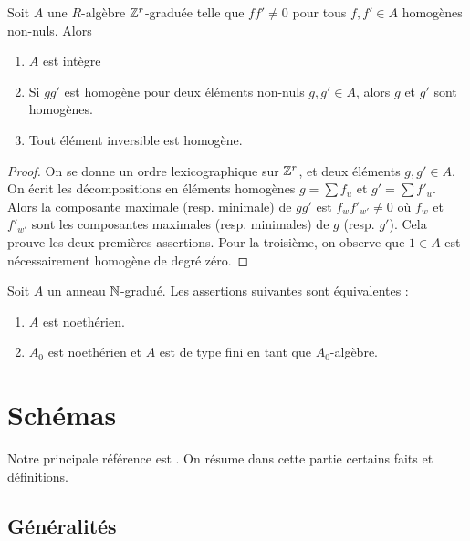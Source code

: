 \begin{prop}\label{GradedProp1}
Soit $A$ une $R$-algèbre $\mathbb{Z}^r$-graduée telle que $ff'\neq 0$ pour tous $f,f'\in A$ homogènes non-nuls. Alors
\begin{enumerate}
\item $A$ est intègre
\item Si $gg'$ est homogène pour deux éléments non-nuls $g,g'\in A$, alors $g$ et $g'$ sont homogènes.
\item Tout élément inversible est homogène.
\end{enumerate}
\end{prop}
\begin{proof}
On se donne un ordre lexicographique sur $\mathbb{Z}^r$, et deux éléments $g,g'\in A$. On écrit les décompositions en éléments homogènes $g=\sum f_u$ et $g'=\sum f'_u$. Alors la composante maximale (resp. minimale) de $gg'$ est $f_wf'_{w'}\neq 0$ où $f_w$ et $f'_{w'}$ sont les composantes maximales (resp. minimales) de $g$ (resp. $g'$). Cela prouve les deux premières assertions. Pour la troisième, on observe que $1\in A$ est nécessairement homogène de degré zéro.
\end{proof}

\begin{prop}\label{GradedPositivNoetherianFG}
Soit $A$ un anneau $\mathbb{N}$-gradué. Les assertions suivantes sont équivalentes :
\begin{enumerate}
\item $A$ est noethérien.
\item $A_0$ est noethérien et $A$ est de type fini en tant que $A_0$-algèbre.
\end{enumerate}
\end{prop}

\section{Schémas}

\noindent Notre principale référence est \cite{Hartshorne}. On résume dans cette partie certains faits et définitions. 

\subsection{Généralités}

